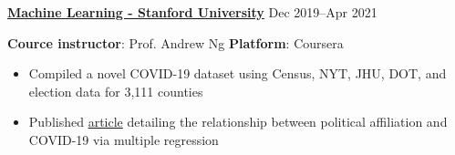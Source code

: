\textbf{\href{https://www.coursera.org/account/accomplishments/verify/636WHFRBMH5V}{Machine Learning - Stanford University}} \hfill Dec 2019--Apr 2021 \par
\textbf{Cource instructor}: Prof. Andrew Ng {\scalerel*{\cdot}{\bigodot}} \textbf{Platform}: Coursera
\begin{itemize}
	\item Compiled a novel COVID-19 dataset using Census, NYT, JHU, DOT, and election data for 3,111 counties
	\item Published \href{https://econreview.berkeley.edu/partisanship-and-covid-19-response/}{article} detailing the relationship between political affiliation and COVID-19 via multiple regression
\end{itemize}\vspace{0.1cm} \par